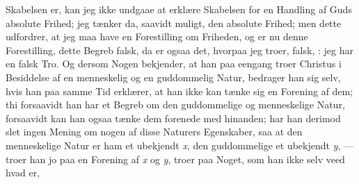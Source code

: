 \documentclass[12pt]{book}
\newcommand{\dsi}{\reflectbox{c}:}
\newcommand{\opage}[1]{\marginnote{\footnotesize\textit{[#1]}}}
\begin{document}
\opage{114} \setcounter{footnote}{0}%
Skabelsen er, kan jeg ikke undgaae at erklære Skabelsen for en Handling af
Guds absolute Frihed; jeg tænker da, saavidt muligt, den absolute Frihed; men
dette udfordrer, at jeg maa have en Forestilling om Friheden, og er nu denne
Forestilling, dette Begreb falsk, da er ogsaa det, hvorpaa jeg troer, falsk,
\dsi{} jeg har en falsk Tro. Og dersom Nogen bekjender, at han paa eengang
troer Christus i Besiddelse af en menneskelig og en guddommelig Natur,
bedrager han sig selv, hvis han paa samme Tid erklærer, at han ikke kan tænke
sig en Forening af dem; thi forsaavidt han har et Begreb om den guddommelige
og menneskelige Natur, forsaavidt kan han ogsaa tænke dem forenede med
hinanden; har han derimod slet ingen Mening om nogen af disse Naturers
Egenskaber, saa at den menneskelige Natur er ham et ubekjendt \textit{x}, den
guddommelige et ubekjendt \textit{y}, --- troer han jo paa en Forening af
\textit{x} og \textit{y}, troer paa Noget, som han ikke selv veed hvad er,
\end{document}
